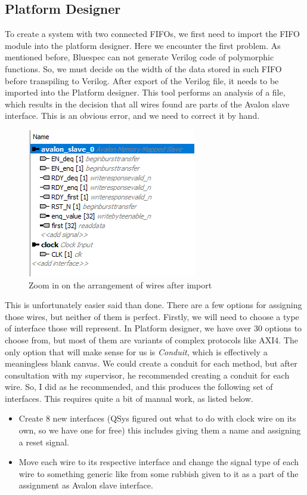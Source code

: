 \documentclass[12pt]{report}
\begin{document}
\subsection{Platform Designer} 
To create a system with two connected FIFOs, we first need to import the FIFO module into the platform designer. 
Here we encounter the first problem. 
As mentioned before, Bluespec can not generate Verilog code of polymorphic functions. 
So, we must decide on the width of the data stored in such FIFO before transpiling to Verilog. 
After export of the Verilog file, it needs to be imported into the Platform designer. 
This tool performs an analysis of a file, which results in the decision that all wires found are parts of the Avalon slave interface. 
This is an obvious error, and we need to correct it by hand. 
\begin{figure}[H] 
    \centering 
    \includegraphics[width=0.5\columnwidth]{images/Example1BeforeOranization.png} \caption{Zoom in on the arrangement of wires after import} 
\end{figure} 
This is unfortunately easier said than done. 
There are a few options for assigning those wires, but neither of them is perfect.
Firstly, we will need to choose a type of interface those will represent. In Platform designer, we have over 30 options to choose from, but most of them are variants of complex protocols like AXI4. 
The only option that will make sense for us is \emph{Conduit}, which is effectively a meaningless blank canvas. We could create a conduit for each method, but after consultation with my supervisor, he recommended creating a conduit for each wire. 
So, I did as he recommended, and this produces the following set of interfaces. This requires quite a bit of manual work, as listed below. 
\begin{itemize} 
    \item Create 8 new interfaces (QSys figured out what to do with clock wire on its own, so we have one for free) this includes giving them a name and assigning a reset signal. 
    \item Move each wire to its respective interface and change the signal type of each wire to something generic like  from some rubbish given to it as a part of the assignment as Avalon slave interface.
\end{itemize} 
\end{document}
